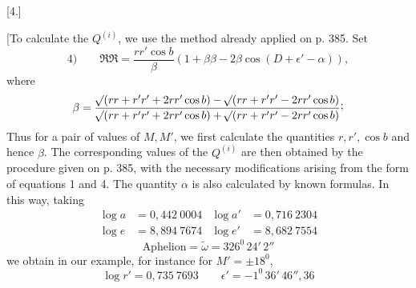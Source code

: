 \clearpage
\par\bigskip{}
\begin{center}[4.]\end{center}
\begingroup\small
\noindent\hspace*{\parindent}[To calculate the \(Q^{(i)}\), we use the method already applied on p. 385. Set
\[
4)\qquad \mathfrak{R}\mathfrak{R}=\frac{rr'\cos b}{\beta}(1+\beta\beta-2\beta\cos(D+\epsilon'-\alpha)),
\]
where
\[
\beta=\frac{\BareRoot{(rr+r'r'+2rr'\cos b)}-\BareRoot{(rr+r'r'-2rr'\cos b)}}{\BareRoot{(rr+r'r'+2rr'\cos b)}+\BareRoot{(rr+r'r'-2rr'\cos b)}}\mathpunct{\raisebox{.45ex}{;}}
\]
Thus for a pair of values of \(M,M'\), we first calculate the quantities \(r,r',\cos b\) and hence \(\beta\). The corresponding values of the \(Q^{(i)}\) are then obtained by the procedure given on p. 385, with the necessary modifications arising from the form of equations 1 and 4. The quantity \(\alpha\) is also calculated by known formulas. In this way, taking
\[
\begin{aligned}
\log a&=0{,}442\ 0004&\log a'&=0{,}716\ 2304\\
\log e&=8{,}894\ 7674&\log e'&=8{,}682\ 7554
\end{aligned}
\]
\[
\text{Aphelion}=\tilde\omega=326^{0}\,24'\,2''
\]
we obtain in our example, for instance for \(M'=\pm18^{0}\),
\[
\log r'=0{,}735\ 7693\qquad \epsilon'=-1^{0}\,36'\,46''{,}36
\]
\begingroup\footnotesize\setlength{\arraycolsep}{2pt}
